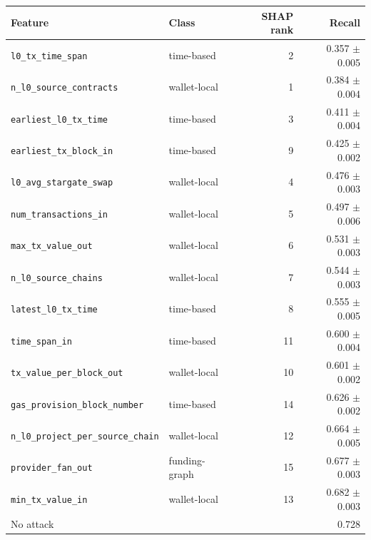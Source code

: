 \begin{tabular}{llrr}
\toprule
Feature & Class & SHAP rank & Recall \\
\midrule
\texttt{l0\_tx\_time\_span} & time-based & 2 & 0.357 $\pm$ 0.005 \\
\texttt{n\_l0\_source\_contracts} & wallet-local & 1 & 0.384 $\pm$ 0.004 \\
\texttt{earliest\_l0\_tx\_time} & time-based & 3 & 0.411 $\pm$ 0.004 \\
\texttt{earliest\_tx\_block\_in} & time-based & 9 & 0.425 $\pm$ 0.002 \\
\texttt{l0\_avg\_stargate\_swap} & wallet-local & 4 & 0.476 $\pm$ 0.003 \\
\texttt{num\_transactions\_in} & wallet-local & 5 & 0.497 $\pm$ 0.006 \\
\texttt{max\_tx\_value\_out} & wallet-local & 6 & 0.531 $\pm$ 0.003 \\
\texttt{n\_l0\_source\_chains} & wallet-local & 7 & 0.544 $\pm$ 0.003 \\
\texttt{latest\_l0\_tx\_time} & time-based & 8 & 0.555 $\pm$ 0.005 \\
\texttt{time\_span\_in} & time-based & 11 & 0.600 $\pm$ 0.004 \\
\texttt{tx\_value\_per\_block\_out} & wallet-local & 10 & 0.601 $\pm$ 0.002 \\
\texttt{gas\_provision\_block\_number} & time-based & 14 & 0.626 $\pm$ 0.002 \\
\texttt{n\_l0\_project\_per\_source\_chain} & wallet-local & 12 & 0.664 $\pm$ 0.005 \\
\texttt{provider\_fan\_out} & funding-graph & 15 & 0.677 $\pm$ 0.003 \\
\texttt{min\_tx\_value\_in} & wallet-local & 13 & 0.682 $\pm$ 0.003 \\
\midrule
No attack & & & 0.728 \\
\bottomrule
\end{tabular}
